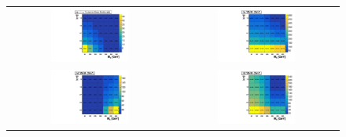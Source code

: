 \begin{figure}[htb]
  \begin{tabular}{cc}
\includegraphics[width=0.49\textwidth]{2HDM/varytanbeta/sinp_0p7071/MH750_MA500_MDM1/2HDMPZ2_xsec_varytanb_sinp0p7071.pdf} &
\includegraphics[width=0.49\textwidth]{2HDM/varytanbeta/sinp_0p7071/MH750_MA500_MDM1/2HDMPZ2_hcwidth_varytanb_sinp0p7071.pdf} \\
\includegraphics[width=0.49\textwidth]{2HDM/varytanbeta/sinp_0p7071/MH750_MA500_MDM1/2HDMPZ2_h4width_varytanb_sinp0p7071.pdf} &
\includegraphics[width=0.49\textwidth]{2HDM/varytanbeta/sinp_0p7071/MH750_MA500_MDM1/2HDMPZ2_h3width_varytanb_sinp0p7071.pdf} \\

\end{tabular}
\end{figure}
